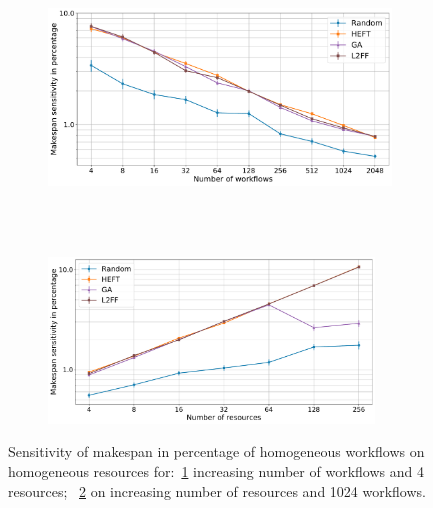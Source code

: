 \begin{figure}[ht!]
    \centering
    \begin{subfigure}[b]{0.75\textwidth}
        \includegraphics[width=.95\textwidth]{figures/campaign/StHomoCampaigns_4DynHomoResourcesSens.pdf}
        \caption{}
        \label{fig:StHomoCampaigns_4DyHomoResourcesSens}
    \end{subfigure}\\
    ~ 
    \begin{subfigure}[b]{0.75\textwidth}
        \includegraphics[width=0.95\textwidth]{figures/campaign/DynHomoResources_StHomoCampaignsSens.pdf}
        \caption{}
        \label{fig:DyHomoResources_StHomoCampaignsSens}
    \end{subfigure}
    \caption{Sensitivity of makespan in percentage of homogeneous workflows on homogeneous resources for:~\ref{fig:StHomoCampaigns_4DyHomoResourcesSens} increasing number of workflows and 4 resources;
        ~\ref{fig:DyHomoResources_StHomoCampaignsSens} on increasing number of resources and 1024 workflows.}
    \label{fig:dyn_homog_sens_analysis}
\end{figure}

